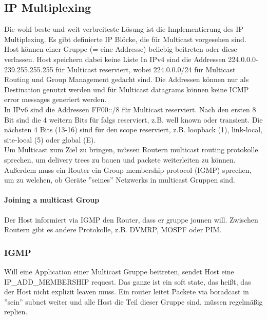     \subsection{IP Multiplexing}
        Die wohl beste und weit verbreiteste Lösung ist die Implementierung des IP Multiplexing. Es gibt definierte IP Blöcke, die für Multicast vorgesehen sind. Host können einer Gruppe (= eine Addresse) beliebig beitreten oder diese verlassen. Host speichern dabei keine Liste 
        In IPv4 sind die Addressen 224.0.0.0-239.255.255.255 für Multicast reserviert, wobei 224.0.0.0/24 für Multicast Routing und Group Management gedacht sind. Die Addressen können nur als Destination genutzt werden und für Multicast datagrams können keine ICMP error messages generiert werden. \\
        In IPv6 sind die Addressen FF00::/8 für Multicast reserviert. Nach den ersten 8 Bit sind die 4 weitern Bits für falgs reserviert, z.B. well known oder transient. Die nächsten 4 Bits (13-16)  sind für den scope reserviert, z.B. loopback (1), link-local, site-local (5) oder global (E). \\
        Um Multicast zum Ziel zu bringen, müssen Routern multicast routing protokolle sprechen, um delivery trees zu bauen und packete weiterleiten zu können. Außerdem muss ein Router ein Group membership protocol (IGMP) sprechen, um zu welchen, ob Geräte ''seines'' Netzwerks in multicast Gruppen sind. 

        \paragraph{Joining a multicast Group}
            Der Host informiert via IGMP den Router, dass er gruppe jounen will. Zwischen Routern gibt es andere Protokolle, z.B. DVMRP, MOSPF oder PIM. 
        
        \subsubsection{IGMP}
            Will eine Application einer Multicast Gruppe beitreten, sendet Host eine IP\_ADD\_MEMBERSHIP request. Das ganze ist ein soft state, das heißt, das der Host nicht explizit leaven muss. Ein router leitet Packete via boradcast in ''sein'' subnet weiter und alle Host die Teil dieser Gruppe sind, müssen regelmäßig replien. 
 
